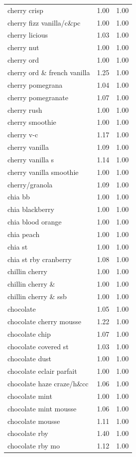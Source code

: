 \begin{table}
\begin{tabular}{lrr}
cherry crisp & 1.00 & 1.00 \\
cherry fizz vanilla/c\&pc & 1.00 & 1.00 \\
cherry licious & 1.03 & 1.00 \\
cherry nut & 1.00 & 1.00 \\
cherry ord & 1.00 & 1.00 \\
cherry ord \& french vanilla & 1.25 & 1.00 \\
cherry pomegrana & 1.04 & 1.00 \\
cherry pomegranate & 1.07 & 1.00 \\
cherry rush & 1.00 & 1.00 \\
cherry smoothie & 1.00 & 1.00 \\
cherry v-c & 1.17 & 1.00 \\
cherry vanilla & 1.09 & 1.00 \\
cherry vanilla s & 1.14 & 1.00 \\
cherry vanilla smoothie & 1.00 & 1.00 \\
cherry/granola & 1.09 & 1.00 \\
chia bb & 1.00 & 1.00 \\
chia blackberry & 1.00 & 1.00 \\
chia blood orange & 1.00 & 1.00 \\
chia peach & 1.00 & 1.00 \\
chia st & 1.00 & 1.00 \\
chia st rby cranberry & 1.08 & 1.00 \\
chillin cherry & 1.00 & 1.00 \\
chillin cherry \& & 1.00 & 1.00 \\
chillin cherry \& ssb & 1.00 & 1.00 \\
chocolate & 1.05 & 1.00 \\
chocolate cherry mousse & 1.22 & 1.00 \\
chocolate chip & 1.07 & 1.00 \\
chocolate covered st & 1.03 & 1.00 \\
chocolate dust & 1.00 & 1.00 \\
chocolate eclair parfait & 1.00 & 1.00 \\
chocolate haze craze/h\&cc & 1.06 & 1.00 \\
chocolate mint & 1.00 & 1.00 \\
chocolate mint mousse & 1.06 & 1.00 \\
chocolate mousse & 1.11 & 1.00 \\
chocolate rby & 1.40 & 1.00 \\
chocolate rby mo & 1.12 & 1.00 \\

\end{tabular}
\end{table}

